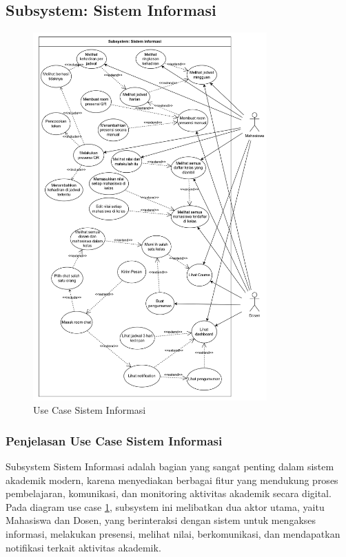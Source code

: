 \documentclass[a4paper,oneside,11pt]{book}
\begin{document}
\subsection{Subsystem: Sistem Informasi}
\begin{figure}[H]
  \centering
  \includegraphics[width=0.8\textwidth]{USECASE/usecaseSistemInformasi.jpg}
  \caption{Use Case Sistem Informasi}
  \label{fig:use_case_sistem_informasi}
\end{figure}

\subsubsection{Penjelasan Use Case Sistem Informasi}

Subsystem Sistem Informasi adalah bagian yang sangat penting dalam sistem akademik modern, karena menyediakan berbagai fitur yang mendukung proses pembelajaran, komunikasi, dan monitoring aktivitas akademik secara digital. Pada diagram use case \ref{fig:use_case_sistem_informasi}, subsystem ini melibatkan dua aktor utama, yaitu Mahasiswa dan Dosen, yang berinteraksi dengan sistem untuk mengakses informasi, melakukan presensi, melihat nilai, berkomunikasi, dan mendapatkan notifikasi terkait aktivitas akademik.
\end{document}
